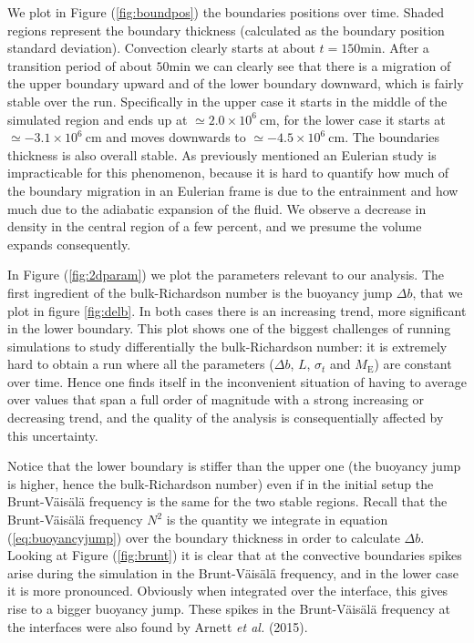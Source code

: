 We plot in Figure (\ref{fig:boundpos}) the boundaries positions over time. Shaded regions represent the boundary thickness (calculated as the boundary position standard deviation). Convection clearly starts at about $t=150 \mathrm{min}$. After a transition period of about $50 \mathrm{min}$ we can clearly see that there is a migration of the upper boundary upward and of the lower boundary downward, which is fairly stable over the run. Specifically in the upper case it starts in the middle of the simulated region and ends up at $\simeq 2.0 \times 10^{6} \ \mathrm{cm}$, for the lower case it starts at $\simeq - 3.1 \times 10^{6} \ \mathrm{cm}$ and moves downwards to $\simeq - 4.5 \times 10^{6} \ \mathrm{cm}$. The boundaries thickness is also overall stable. As previously mentioned an Eulerian study is impracticable for this phenomenon, because it is hard to quantify how much of the boundary migration in an Eulerian frame is due to the entrainment and how much due to the adiabatic expansion of the fluid. We observe a decrease in density in the central region of a few percent, and we presume the volume expands consequently. 

In Figure (\ref{fig:2dparam}) we plot the parameters relevant to our analysis. 
The first ingredient of the bulk-Richardson number is the buoyancy jump $\Delta b$, that we plot in figure \ref{fig:delb}. In both cases there is an increasing trend, more significant in the lower boundary. This plot shows one of the biggest challenges of running simulations to study differentially the bulk-Richardson number: it is extremely hard to obtain a run where all the parameters ($\Delta b$, $L$, $\sigma_t$ and $M_{\mathrm{E}}$) are constant over time. Hence one finds itself in the inconvenient situation of having to average over values that span a full order of magnitude with a strong increasing or decreasing trend, and the quality of the analysis is consequentially affected by this uncertainty. 

Notice that the lower boundary is stiffer than the upper one (the buoyancy jump is higher, hence the bulk-Richardson number) even if in the initial setup the Brunt-Väisälä frequency is the same for the two stable regions. Recall that the Brunt-Väisälä frequency $N^2$ is the quantity we integrate in equation (\ref{eq:buoyancyjump}) over the boundary thickness in order to calculate $\Delta b$. Looking at Figure (\ref{fig:brunt}) it is clear that at the convective boundaries spikes arise during the simulation in the Brunt-Väisälä frequency, and in the lower case it is more pronounced. Obviously when integrated over the interface, this gives rise to a bigger buoyancy jump. These spikes in the Brunt-Väisälä frequency at the interfaces were also found by Arnett \emph{et al.} (2015).

